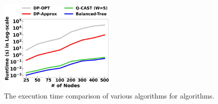\begin{figure}
    \centering
    \includegraphics[width=0.5\textwidth]{chapters/swappingtrees/figures/runtime-sp.png}
    \caption{The execution time comparison of various algorithms for \spp algorithms.}
    \label{fig:swapping_runtime}
\end{figure}




    


